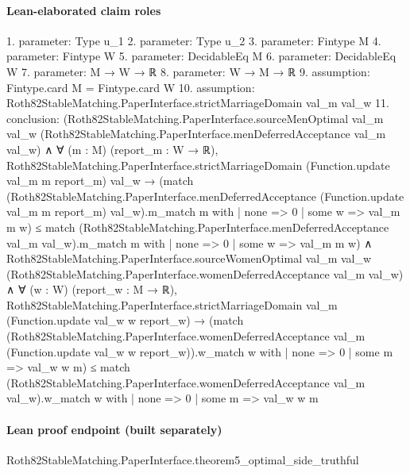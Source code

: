 \documentclass[10pt]{article}
\begin{document}
\paragraph{Lean-elaborated claim roles}\begin{ReviewVerbatim}
1. parameter: Type u_1
2. parameter: Type u_2
3. parameter: Fintype M
4. parameter: Fintype W
5. parameter: DecidableEq M
6. parameter: DecidableEq W
7. parameter: M → W → ℝ
8. parameter: W → M → ℝ
9. assumption: Fintype.card M = Fintype.card W
10. assumption: Roth82StableMatching.PaperInterface.strictMarriageDomain val_m val_w
11. conclusion: (Roth82StableMatching.PaperInterface.sourceMenOptimal val_m val_w
      (Roth82StableMatching.PaperInterface.menDeferredAcceptance val_m val_w) ∧
    ∀ (m : M) (report_m : W → ℝ),
      Roth82StableMatching.PaperInterface.strictMarriageDomain (Function.update val_m m report_m) val_w →
        (match
            (Roth82StableMatching.PaperInterface.menDeferredAcceptance (Function.update val_m m report_m) val_w).m_match
              m with
          | none => 0
          | some w => val_m m w) ≤
          match (Roth82StableMatching.PaperInterface.menDeferredAcceptance val_m val_w).m_match m with
          | none => 0
          | some w => val_m m w) ∧
  Roth82StableMatching.PaperInterface.sourceWomenOptimal val_m val_w
      (Roth82StableMatching.PaperInterface.womenDeferredAcceptance val_m val_w) ∧
    ∀ (w : W) (report_w : M → ℝ),
      Roth82StableMatching.PaperInterface.strictMarriageDomain val_m (Function.update val_w w report_w) →
        (match
            (Roth82StableMatching.PaperInterface.womenDeferredAcceptance val_m
                  (Function.update val_w w report_w)).w_match
              w with
          | none => 0
          | some m => val_w w m) ≤
          match (Roth82StableMatching.PaperInterface.womenDeferredAcceptance val_m val_w).w_match w with
          | none => 0
          | some m => val_w w m
\end{ReviewVerbatim}

\paragraph{Lean proof endpoint (built separately)}\begin{ReviewVerbatim}
Roth82StableMatching.PaperInterface.theorem5_optimal_side_truthful
\end{ReviewVerbatim}
\end{document}
